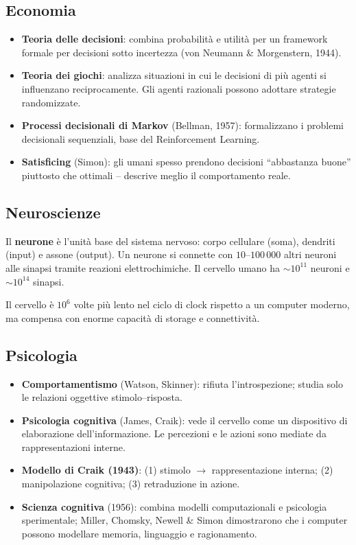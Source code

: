 \subsection{Economia}
\begin{itemize}
    \item \textbf{Teoria delle decisioni}: combina probabilit\`a e utilit\`a per un framework formale per decisioni sotto incertezza (von Neumann \& Morgenstern, 1944).
    \item \textbf{Teoria dei giochi}: analizza situazioni in cui le decisioni di pi\`u agenti si influenzano reciprocamente. Gli agenti razionali possono adottare strategie randomizzate.
    \item \textbf{Processi decisionali di Markov} (Bellman, 1957): formalizzano i problemi decisionali sequenziali, base del Reinforcement Learning.
    \item \textbf{Satisficing} (Simon): gli umani spesso prendono decisioni ``abbastanza buone'' piuttosto che ottimali -- descrive meglio il comportamento reale.
\end{itemize}


\subsection{Neuroscienze}
Il \textbf{neurone} \`e l'unit\`a base del sistema nervoso: corpo cellulare (soma), dendriti (input) e assone (output). Un neurone si connette con $10$--$100\,000$ altri neuroni alle sinapsi tramite reazioni elettrochimiche. Il cervello umano ha $\sim 10^{11}$ neuroni e $\sim 10^{14}$ sinapsi.

\begin{notebox}
Il cervello \`e $10^6$ volte pi\`u lento nel ciclo di clock rispetto a un computer moderno, ma compensa con enorme capacit\`a di storage e connettivit\`a.
\end{notebox}


\subsection{Psicologia}
\begin{itemize}
    \item \textbf{Comportamentismo} (Watson, Skinner): rifiuta l'introspezione; studia solo le relazioni oggettive stimolo--risposta.
    \item \textbf{Psicologia cognitiva} (James, Craik): vede il cervello come un dispositivo di elaborazione dell'informazione. Le percezioni e le azioni sono mediate da rappresentazioni interne.
    \item \textbf{Modello di Craik (1943)}: (1) stimolo $\to$ rappresentazione interna; (2) manipolazione cognitiva; (3) retraduzione in azione.
    \item \textbf{Scienza cognitiva} (1956): combina modelli computazionali e psicologia sperimentale; Miller, Chomsky, Newell \& Simon dimostrarono che i computer possono modellare memoria, linguaggio e ragionamento.
\end{itemize}


